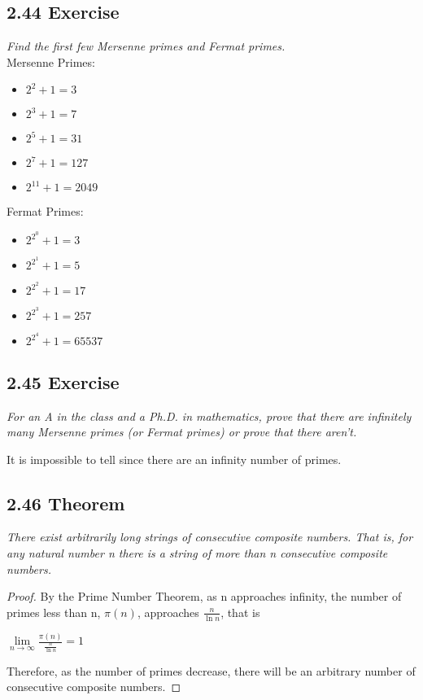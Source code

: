 \documentclass{article}
\begin{document}
\subsection*{2.44 Exercise} 
\quad \textit{Find the first few Mersenne primes and Fermat primes.}\\

Mersenne Primes:
\begin{itemize}
    \item $2^{2} + 1 = 3$
    \item $2^{3} + 1 = 7$
    \item $2^{5} + 1 = 31$
    \item $2^{7} + 1 = 127$
    \item $2^{11} + 1 = 2049$
\end{itemize}
Fermat Primes:
\begin{itemize}
    \item $2^{2^0} + 1 = 3$
    \item $2^{2^1} + 1 = 5$
    \item $2^{2^2} + 1 = 17$
    \item $2^{2^3} + 1 = 257$
    \item $2^{2^4} + 1 = 65537$
\end{itemize}

\subsection*{2.45 Exercise} 
\quad \textit{For an A in the class and a Ph.D. in mathematics, prove that there are infinitely many Mersenne primes (or Fermat primes) or prove that there aren't.}

It is impossible to tell since there are an infinity number of primes.

\subsection*{2.46 Theorem} 
\quad \textit{There exist arbitrarily long strings of consecutive composite numbers. That is, for any natural number n there is a string of more than n consecutive composite numbers.}

\begin{proof}
By the Prime Number Theorem, as n approaches infinity, the number of primes less than n, $\pi(n)$, approaches $\frac{n}{\ln{n}}$, that is 
    \begin{center}
        $\lim\limits_{n\to \infty} {\frac{\pi(n)}{\frac{n}{\ln{n}}} = 1}$ 
    \end{center}
Therefore, as the number of primes decrease, there will be an arbitrary number of consecutive composite numbers.
\end{proof}
\end{document}
